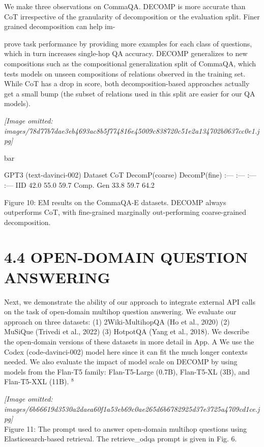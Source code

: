 \documentclass[
]{article}
\begin{document}
We make three observations on CommaQA. DECOMP is more accurate than CoT
irrespective of the granularity of decomposition or the evaluation
split. Finer grained decomposition can help im-

prove task performance by providing more examples for each class of
questions, which in turn increases single-hop QA accuracy. DECOMP
generalizes to new compositions such as the compositional generalization
split of CommaQA, which tests models on unseen compositions of relations
observed in the training set. While CoT has a drop in score, both
decomposition-based approaches actually get a small bump (the subset of
relations used in this split are easier for our QA models).

\textit{[Image omitted: images/78d77b7dae3eb4693ac8b5f774816e45009c838720c51e2a134702b0637cc0e1.jpg]}

bar

GPT3 (text-davinci-002) \textbar{} Dataset \textbar{} CoT \textbar{}
DecomP(coarse) \textbar{} DecomP(fine) \textbar{} \textbar{} :---
\textbar{} :--- \textbar{} :--- \textbar{} :--- \textbar{} \textbar{}
IID \textbar{} 42.0 \textbar{} 55.0 \textbar{} 59.7 \textbar{}
\textbar{} Comp. Gen \textbar{} 33.8 \textbar{} 59.7 \textbar{} 64.2
\textbar{}

Figure 10: EM results on the CommaQA-E datasets. DECOMP always
outperforms CoT, with fine-grained marginally out-performing
coarse-grained decomposition.

\section{4.4 OPEN-DOMAIN QUESTION
ANSWERING}\label{open-domain-question-answering}

Next, we demonstrate the ability of our approach to integrate external
API calls on the task of open-domain multihop question answering. We
evaluate our approach on three datasets: (1) 2Wiki-MultihopQA (Ho et
al., 2020) (2) MuSiQue (Trivedi et al., 2022) (3) HotpotQA (Yang et al.,
2018). We describe the open-domain versions of these datasets in more
detail in App. A We use the Codex (code-davinci-002) model here since it
can fit the much longer contexts needed. We also evaluate the impact of
model scale on DECOMP by using models from the Flan-T5 family:
Flan-T5-Large (0.7B), Flan-T5-XL (3B), and Flan-T5-XXL (11B). \(^{8}\)

\textit{[Image omitted: images/6b66619d3530a2daea60f1a53eb69c0ae265d6b6782925d37e3725a4709cd1ce.jpg]}\\
Figure 11: The prompt used to answer open-domain multihop questions
using Elasticsearch-based retrieval. The retrieve\_odqa prompt is given
in Fig. 6.
\end{document}
